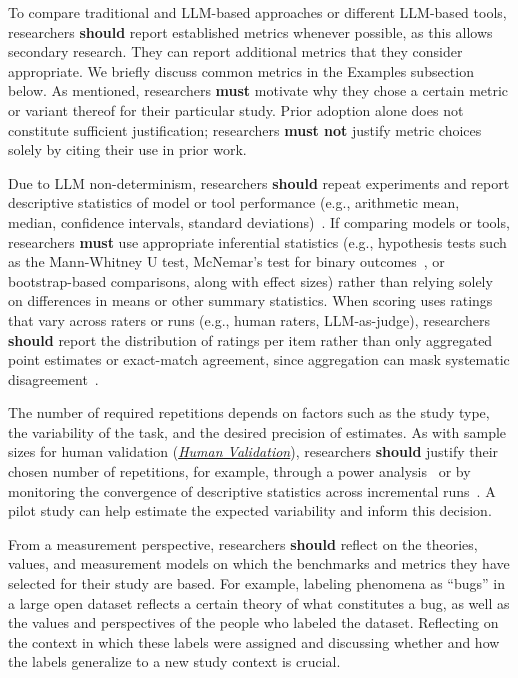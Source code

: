 \documentclass[smallextended]{svjour3}
\newcommand{\must}{\textbf{must}\xspace}
\newcommand{\mustnot}{\textbf{must not}\xspace}
\newcommand{\should}{\textbf{should}\xspace}
\newcommand{\humanvalidation}{\hyperref[sec:use-human-validation-for-llm-outputs]{\emph{Human Validation}}\xspace}
\newcommand{\humanvalidation}{\href{/guidelines\#use-human-validation-for-llm-outputs}{\emph{Human Validation}}\xspace}
\begin{document}
To compare traditional and LLM-based approaches or different LLM-based tools, researchers \should report established metrics whenever possible, as this allows secondary research.
They can report additional metrics that they consider appropriate.
We briefly discuss common metrics in the Examples subsection below.
As mentioned, researchers \must motivate why they chose a certain metric or variant thereof for their particular study.
Prior adoption alone does not constitute sufficient justification; researchers \mustnot justify metric choices solely by citing their use in prior work.

Due to LLM non-determinism, researchers \should repeat experiments and report descriptive statistics of model or tool performance (e.g., arithmetic mean, median, confidence intervals, standard deviations)~\cite{DBLP:conf/nips/AgarwalSCCB21, DBLP:journals/corr/abs-2602-07150}. If comparing models or tools, researchers \must use appropriate inferential statistics (e.g., hypothesis tests such as the Mann-Whitney U test, McNemar's test for binary outcomes~\cite{DBLP:conf/iclr/KublerBKZYKK26}, or bootstrap-based comparisons, along with effect sizes) rather than relying solely on differences in means or other summary statistics. When scoring uses ratings that vary across raters or runs (e.g., human raters, LLM-as-judge), researchers \should report the distribution of ratings per item rather than only aggregated point estimates or exact-match agreement, since aggregation can mask systematic disagreement~\cite{bean2025measuring}.

The number of required repetitions depends on factors such as the study type, the variability of the task, and the desired precision of estimates. As with sample sizes for human validation (\humanvalidation), researchers \should justify their chosen number of repetitions, for example, through a power analysis~\cite{Cohen1992, DBLP:journals/corr/abs-2602-07150} or by monitoring the convergence of descriptive statistics across incremental runs~\cite{DBLP:journals/corr/abs-2410-03492}. A pilot study can help estimate the expected variability and inform this decision.

From a measurement perspective, researchers \should reflect on the theories, values, and measurement models on which the benchmarks and metrics they have selected for their study are based.
For example, labeling phenomena as ``bugs'' in a large open dataset reflects a certain theory of what constitutes a bug, as well as the values and perspectives of the people who labeled the dataset. Reflecting on the context in which these labels were assigned and discussing whether and how the labels generalize to a new study context is crucial.
\end{document}
